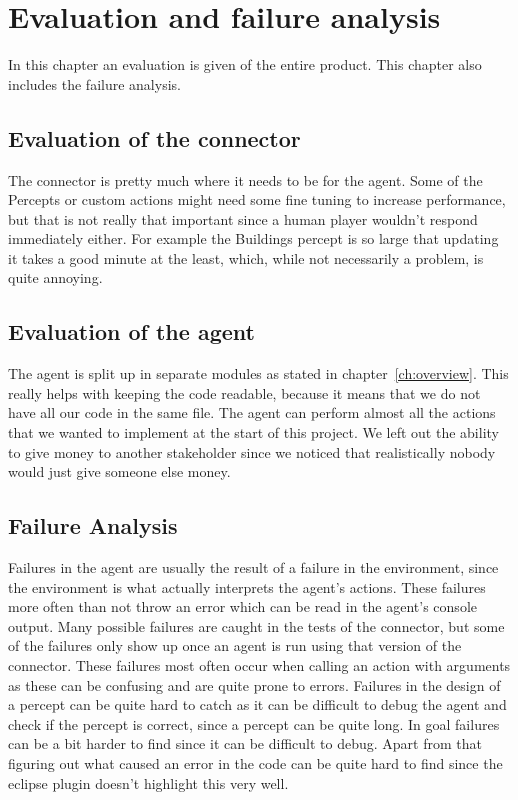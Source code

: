 \chapter{Evaluation and failure analysis}
In this chapter an evaluation is given of the entire product. This chapter also includes the failure analysis. 

\section{Evaluation of the connector}
The connector is pretty much where it needs to be for the agent.
Some of the Percepts or custom actions might need some fine tuning to increase performance, but that is not really that important since a human player wouldn't respond immediately either.
For example the Buildings percept is so large that updating it takes a good minute at the least, which, while not necessarily a problem, is quite annoying.

\section{Evaluation of the agent}
The agent is split up in separate modules as stated in chapter~\ref{ch:overview}.
This really helps with keeping the code readable, because it means that we do not have all our code in the same file.
The agent can perform almost all the actions that we wanted to implement at the start of this project.
We left out the ability to give money to another stakeholder since we noticed that realistically nobody would just give someone else money.

\section{Failure Analysis}
Failures in the agent are usually the result of a failure in the environment, since the environment is what actually interprets the agent's actions.
These failures more often than not throw an error which can be read in the agent's console output.
Many possible failures are caught in the tests of the connector, but some of the failures only show up once an agent is run using that version of the connector.
These failures most often occur when calling an action with arguments as these can be confusing and are quite prone to errors.
Failures in the design of a percept can be quite hard to catch as it can be difficult to debug the agent and check if the percept is correct, since a percept can be quite long.
In goal failures can be a bit harder to find since it can be difficult to debug.
Apart from that figuring out what caused an error in the code can be quite hard to find since the eclipse plugin doesn't highlight this very well.
